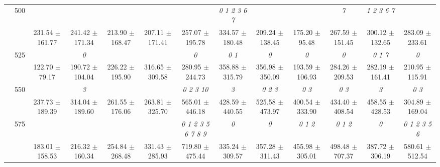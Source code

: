 \begin{table}[h]
{\begin{tabular}{
        ccccccccccccc}
 & \multirow{2}{*}{500}& & & & & & \textit{ 0 1 2 3 6 7 }& & & \textit{ 7 }& \textit{ 1 2 3 6 7 }&  \\ 
 & & 231.54 $\pm$ 161.77& 241.42 $\pm$ 171.34& 213.90 $\pm$ 168.47& 207.11 $\pm$ 171.41& 257.07 $\pm$ 195.78& 334.57 $\pm$ 180.48& 209.24 $\pm$ 138.45& 175.20 $\pm$ 95.48& 267.59 $\pm$ 151.45& 300.12 $\pm$ 132.65& 283.09 $\pm$ 233.61 \\ 
 & \multirow{2}{*}{525}& \cellcolor[HTML]{EFEFEF} & \cellcolor[HTML]{EFEFEF} \textit{ 0 }& \cellcolor[HTML]{EFEFEF} & \cellcolor[HTML]{EFEFEF} & \cellcolor[HTML]{EFEFEF} \textit{ 0 }& \cellcolor[HTML]{EFEFEF} \textit{ 0 1 }& \cellcolor[HTML]{EFEFEF} \textit{ 0 }& \cellcolor[HTML]{EFEFEF} \textit{ 0 }& \cellcolor[HTML]{EFEFEF} \textit{ 0 }& \cellcolor[HTML]{EFEFEF} \textit{ 0 1 7 }& \cellcolor[HTML]{EFEFEF} \textit{ 0 } \\ 
 & & \cellcolor[HTML]{EFEFEF} 122.70 $\pm$ 79.17& \cellcolor[HTML]{EFEFEF} 190.72 $\pm$ 104.04& \cellcolor[HTML]{EFEFEF} 226.22 $\pm$ 195.90& \cellcolor[HTML]{EFEFEF} 316.65 $\pm$ 309.58& \cellcolor[HTML]{EFEFEF} 280.95 $\pm$ 244.73& \cellcolor[HTML]{EFEFEF} 358.88 $\pm$ 315.79& \cellcolor[HTML]{EFEFEF} 356.98 $\pm$ 350.09& \cellcolor[HTML]{EFEFEF} 193.59 $\pm$ 106.93& \cellcolor[HTML]{EFEFEF} 284.26 $\pm$ 209.53& \cellcolor[HTML]{EFEFEF} 282.19 $\pm$ 161.41& \cellcolor[HTML]{EFEFEF} 210.95 $\pm$ 115.91 \\ 
 & \multirow{2}{*}{550}& & \textit{ 3 }& & & \textit{  0  2  3 10 }& \textit{ 3 }& \textit{ 0 2 3 }& \textit{ 0 3 }& \textit{ 0 3 }& \textit{ 3 }& \textit{ 0 3 } \\ 
 & & 237.73 $\pm$ 189.39& 314.04 $\pm$ 189.60& 261.55 $\pm$ 176.06& 263.81 $\pm$ 325.70& 565.01 $\pm$ 446.18& 428.59 $\pm$ 440.55& 525.58 $\pm$ 473.97& 400.54 $\pm$ 333.90& 434.40 $\pm$ 408.54& 458.55 $\pm$ 428.53& 304.89 $\pm$ 169.04 \\ 
 & \multirow{2}{*}{575}& \cellcolor[HTML]{EFEFEF} & \cellcolor[HTML]{EFEFEF} & \cellcolor[HTML]{EFEFEF} & \cellcolor[HTML]{EFEFEF} & \cellcolor[HTML]{EFEFEF} \textit{ 0 1 2 3 5 6 7 8 9 }& \cellcolor[HTML]{EFEFEF} \textit{ 0 }& \cellcolor[HTML]{EFEFEF} \textit{ 0 }& \cellcolor[HTML]{EFEFEF} \textit{ 0 1 2 }& \cellcolor[HTML]{EFEFEF} \textit{ 0 1 2 }& \cellcolor[HTML]{EFEFEF} \textit{ 0 }& \cellcolor[HTML]{EFEFEF} \textit{ 0 1 2 3 5 6 } \\ 
 & & \cellcolor[HTML]{EFEFEF} 183.01 $\pm$ 158.53& \cellcolor[HTML]{EFEFEF} 216.32 $\pm$ 160.34& \cellcolor[HTML]{EFEFEF} 254.84 $\pm$ 268.48& \cellcolor[HTML]{EFEFEF} 331.43 $\pm$ 285.93& \cellcolor[HTML]{EFEFEF} 719.80 $\pm$ 475.44& \cellcolor[HTML]{EFEFEF} 335.24 $\pm$ 309.57& \cellcolor[HTML]{EFEFEF} 357.28 $\pm$ 311.43& \cellcolor[HTML]{EFEFEF} 455.98 $\pm$ 305.01& \cellcolor[HTML]{EFEFEF} 498.48 $\pm$ 707.37& \cellcolor[HTML]{EFEFEF} 387.72 $\pm$ 306.19& \cellcolor[HTML]{EFEFEF} 580.61 $\pm$ 512.54 \\ 

\end{tabular}}
\end{table}
